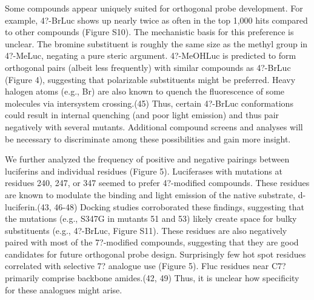 \par
Some compounds appear uniquely suited for orthogonal probe development. For example, 4?-BrLuc shows up nearly twice as often in the top 1,000 hits compared to other compounds (Figure S10). The mechanistic basis for this preference is unclear. The bromine substituent is roughly the same size as the methyl group in 4?-MeLuc, negating a pure steric argument. 4?-MeOHLuc is predicted to form orthogonal pairs (albeit less frequently) with similar compounds as 4?-BrLuc (Figure 4), suggesting that polarizable substituents might be preferred. Heavy halogen atoms (e.g., Br) are also known to quench the fluorescence of some molecules via intersystem crossing.(45) Thus, certain 4?-BrLuc conformations could result in internal quenching (and poor light emission) and thus pair negatively with several mutants. Additional compound screens and analyses will be necessary to discriminate among these possibilities and gain more insight.
\par
We further analyzed the frequency of positive and negative pairings between luciferins and individual residues (Figure 5). Luciferases with mutations at residues 240, 247, or 347 seemed to prefer 4?-modified compounds. These residues are known to modulate the binding and light emission of the native substrate, d-luciferin.(43, 46-48) Docking studies corroborated these findings, suggesting that the mutations (e.g., S347G in mutants 51 and 53) likely create space for bulky substituents (e.g., 4?-BrLuc, Figure S11). These residues are also negatively paired with most of the 7?-modified compounds, suggesting that they are good candidates for future orthogonal probe design. Surprisingly few hot spot residues correlated with selective 7? analogue use (Figure 5). Fluc residues near C7? primarily comprise backbone amides.(42, 49) Thus, it is unclear how specificity for these analogues might arise.

